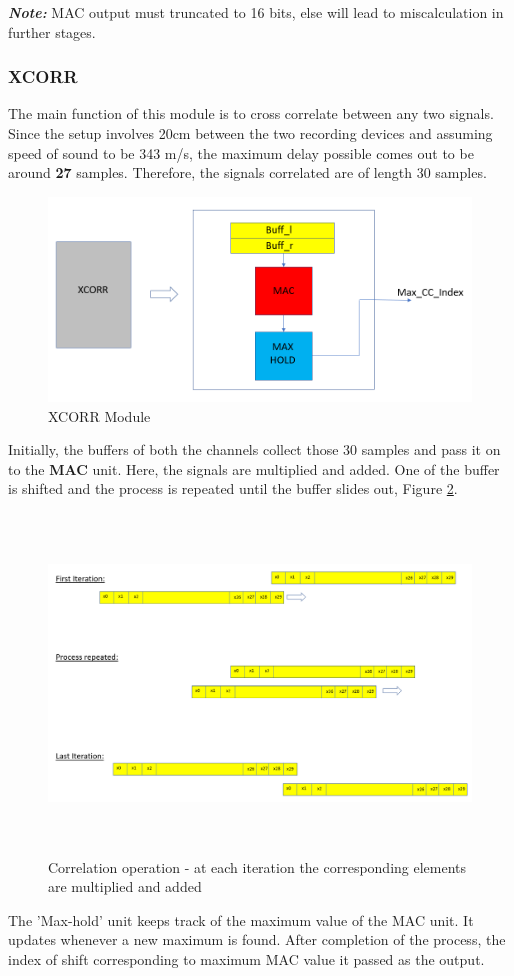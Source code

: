 \documentclass[BTech]{nitkdiss}
\begin{document}
\textit{\textbf{Note:}} MAC output must truncated to 16 bits, else will lead to miscalculation in further stages. 

\subsubsection{XCORR}
The main function of  this module is to cross correlate between any two signals. Since the setup involves 20cm between the two recording devices and assuming speed of sound to be 343 m/s, the maximum delay possible comes out to be around \textbf{27} samples. Therefore, the signals correlated are of length 30 samples.  
\begin{figure}[h!]
\includegraphics[width = \textwidth]{xcorr}
\caption{XCORR Module}
\label{fig: xcorr_module}
\end{figure}
Initially, the buffers of both the channels collect those 30 samples and pass it on to the \textbf{MAC} unit. Here, the signals are multiplied and added. One of the buffer is shifted and the process is repeated until the buffer slides out, Figure \ref{fig : correlation}. 
\begin{figure}[h!]
\includegraphics[width = \textwidth, height = 9cm]{slide}
\caption{Correlation operation -  at each iteration the corresponding elements are multiplied and added}
\label{fig : correlation}
\end{figure}                
The 'Max-hold' unit keeps track of the maximum value of the MAC unit. It updates whenever a new maximum is found. After completion of the process, the index of shift corresponding to maximum MAC value it passed as the output.
\end{document}
